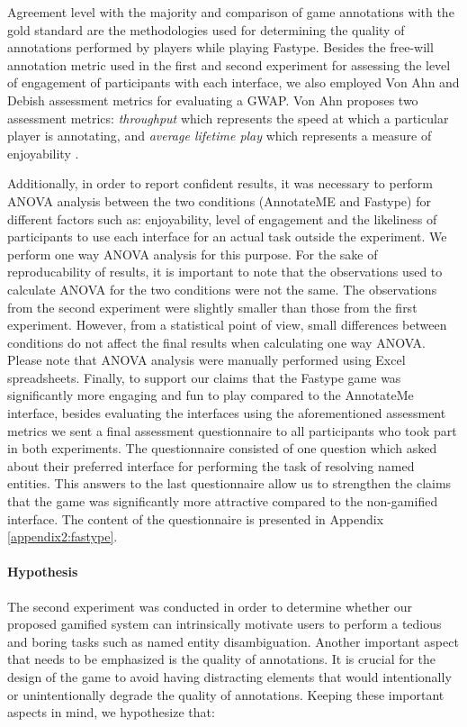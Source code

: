 Agreement level with the majority and comparison of game annotations with the gold standard are the methodologies used for determining the quality of annotations performed by players while playing Fastype. Besides the free-will annotation metric used in the first and second experiment for assessing the level of engagement of participants with each interface, we also employed Von Ahn and Debish \cite{44} assessment metrics for evaluating a GWAP. Von Ahn proposes two assessment metrics: \textit{throughput} which represents the speed at which a particular player is annotating, and \textit{average lifetime play} which represents a measure of enjoyability \cite{44}.


Additionally, in order to report confident results, it was necessary to perform ANOVA analysis between the two conditions (AnnotateME and Fastype) for different factors such as: enjoyability, level of engagement and the likeliness of participants  to use each interface for an actual task outside the experiment. We perform one way ANOVA analysis for this purpose. For the sake of reproducability of results, it is important to note that the observations used to calculate ANOVA for the two conditions were not the same. The observations from the second experiment were slightly smaller than those from the first experiment. However, from a statistical point of view, small differences between conditions do not affect the final results when calculating one way ANOVA. Please note that ANOVA analysis were manually performed using Excel spreadsheets. Finally, to support our claims that the Fastype game was significantly more engaging and fun to play compared to the AnnotateMe interface, besides evaluating the interfaces using the aforementioned assessment metrics we sent a final assessment questionnaire to all participants who took part in both experiments. The questionnaire consisted of one question which asked about their preferred interface for performing the task of resolving named entities. This answers to the last questionnaire allow us to strengthen the claims that the game was significantly more attractive compared to the non-gamified interface. The content of the questionnaire is presented in Appendix \ref{appendix2:fastype}.  



\paragraph{Hypothesis}
The second experiment was conducted in order to determine whether our proposed gamified system can intrinsically motivate users to perform a tedious and boring tasks such as named entity disambiguation. Another important aspect that needs to be emphasized is the quality of annotations. It is crucial for the design of the game to avoid having distracting elements that would intentionally or unintentionally degrade the quality of annotations. Keeping these important aspects in mind, we hypothesize that: 

